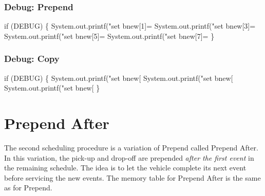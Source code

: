 \subsection{Debug: Prepend}

\nwenddocs{}\endmoddef\nwstartdeflinemarkup{}\nwenddeflinemarkup
if (DEBUG) \{
  System.out.printf("set bnew[1]=%
  System.out.printf("set bnew[3]=%
  System.out.printf("set bnew[5]=%
  System.out.printf("set bnew[7]=%
\}
\nwendcode{}\nwdocspar

\subsection{Debug: Copy}

\nwenddocs{}\endmoddef\nwstartdeflinemarkup{}\nwenddeflinemarkup
if (DEBUG) \{
  System.out.printf("set bnew[%
  System.out.printf("set bnew[%
  System.out.printf("set bnew[%
\}
\nwendcode{}\nwdocspar

\nwenddocs{}\chapter{Prepend After}
\label{sched-prepend-after}

The second scheduling procedure is a variation of Prepend called Prepend After.
In this variation, the pick-up and drop-off are prepended \textit{after the
first event} in the remaining schedule. The idea is to let the vehicle complete
its next event before servicing the new events. The memory table for
Prepend After is the same as for Prepend.

